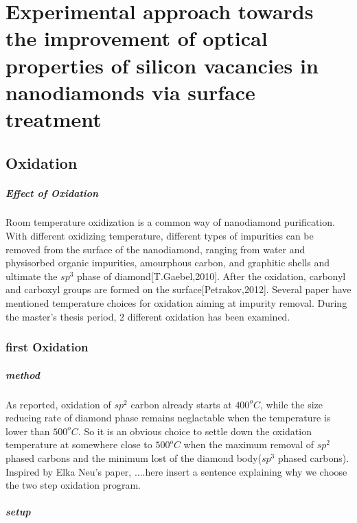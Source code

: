 
\chapter{Experimental approach towards the improvement of optical properties of silicon vacancies in nanodiamonds via surface treatment} %

\label{Chapter2.5} %



\section{Oxidation}
\paragraph{Effect of Oxidation}
Room temperature oxidization is a common way of nanodiamond purification. With different oxidizing temperature, different types of impurities can be removed from the surface of the nanodiamond, ranging from water and physisorbed organic impurities, amourphous carbon, and graphitic shells and ultimate the $sp^{3}$ phase of diamond[T.Gaebel,2010]. After the oxidation, carbonyl and carboxyl groups are formed on the surface[Petrakov,2012]. Several paper have mentioned temperature choices for oxidation aiming at impurity removal. During the master's thesis period, 2 different oxidation has been examined.

\subsection[first Oxidation]{first Oxidation}
\paragraph{method}As reported, oxidation of $sp^{2}$ carbon already starts at $400^{o}C$, while the size reducing rate of diamond phase remains neglactable when the temperature is lower than $500^{o}C$. So it is an obvious choice to settle down the oxidation temperature at somewhere close to $500^{o}C$ when the maximum removal of $sp^{2}$ phased carbons and the minimum lost of the diamond body($sp^{3}$ phased carbons). Inspired by Elka Neu's paper, ....here insert a sentence explaining why we choose the two step oxidation program.
\paragraph{setup}


